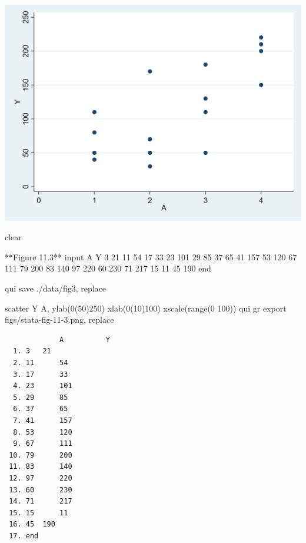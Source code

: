 \documentclass[
  10pt,
  a4paper,
]{book}
\newenvironment{Shaded}{\begin{snugshade}}{\end{snugshade}}
\newcommand{\BaseNTok}[1]{\textcolor[rgb]{0.68,0.00,0.00}{#1}}
\newcommand{\KeywordTok}[1]{\textcolor[rgb]{0.00,0.46,0.62}{#1}}
\newcommand{\NormalTok}[1]{\textcolor[rgb]{0.00,0.46,0.62}{#1}}
\begin{document}
\begin{center}\includegraphics[width=0.85\linewidth]{figs/stata-fig-11-2} \end{center}

\begin{Shaded}
\begin{Highlighting}[]
\KeywordTok{clear}

\NormalTok{**Figure 11.3**}
\NormalTok{input A Y}
\NormalTok{3   21  }
\NormalTok{11  54}
\NormalTok{17  33}
\NormalTok{23  101}
\NormalTok{29  85}
\NormalTok{37  65}
\NormalTok{41  157}
\NormalTok{53  120}
\NormalTok{67  111}
\NormalTok{79  200}
\NormalTok{83  140}
\NormalTok{97  220}
\NormalTok{60  230}
\NormalTok{71  217}
\NormalTok{15  11}
\NormalTok{45  190}
\KeywordTok{end}

\KeywordTok{qui} \KeywordTok{save}\NormalTok{ ./}\KeywordTok{data}\NormalTok{/fig3, }\KeywordTok{replace}

\KeywordTok{scatter}\NormalTok{ Y A, ylab(0(50)250) xlab(0(10)100) }\BaseNTok{xscale}\NormalTok{(}\KeywordTok{range}\NormalTok{(0 100))}
\KeywordTok{qui} \KeywordTok{gr} \KeywordTok{export}\NormalTok{ figs/stata{-}fig{-}11{-}3.png, }\KeywordTok{replace}
\end{Highlighting}
\end{Shaded}

\begin{verbatim}
             A          Y
  1. 3   21  
  2. 11      54
  3. 17      33
  4. 23      101
  5. 29      85
  6. 37      65
  7. 41      157
  8. 53      120
  9. 67      111
 10. 79      200
 11. 83      140
 12. 97      220
 13. 60      230
 14. 71      217
 15. 15      11
 16. 45  190
 17. end
\end{verbatim}
\end{document}
